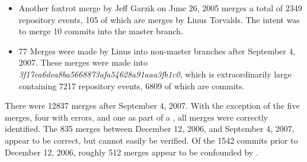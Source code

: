 \begin{itemize}
  \item

    Another foxtrot merge by Jeff Garzik on June 26, 2005 merges a
    total of 2349 repository events, 105 of which are merges by Linus
    Torvalds. The intent was to merge 10 commits into the master branch.

  \item

    77 Merges were made by Linus into non-master branches after
    September 4, 2007. These merges were made into
    \emph{3f17ea6dea8ba5668873afa54628a91aaa3fb1c0}, which is
    extraordinarily large containing 7217 repository events, 6809 of
    which are commits.

\end{itemize}

There were 12837 merges after September 4, 2007. With the exception of
the five merges, four with errors, and one as part of a \foxtrot{}, all
merges were correctly identified. The 835 merges between December 12,
2006, and September 4, 2007, appear to be correct, but cannot easily be
verified. Of the 1542 commits prior to December 12, 2006, roughly 512
merges appear to be confounded by .
